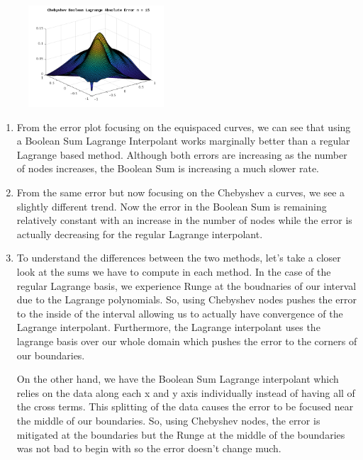 \documentclass[a4paper,12pt]{article}
\begin{document}
\begin{enumerate}[label = \arabic*.]
\begin{figure}[h!]
		\includegraphics[width = 0.45\textwidth]{images/CB15.png}
	\end{figure}

	\newpage
	\begin{enumerate}[label = (\alph*)]
		\item From the error plot focusing on the equispaced curves, we can see that using a Boolean Sum Lagrange Interpolant works marginally better than a regular Lagrange based method. Although both errors are increasing as the number of nodes increases, the Boolean Sum is increasing a much slower rate.
		
		\item From the same error but now focusing on the Chebyshev a curves, we see a slightly different trend. Now the error in the Boolean Sum is remaining relatively constant with an increase in the number of nodes while the error is actually decreasing for the regular Lagrange interpolant.
		 
		\item To understand the differences between the two methods, let's take a closer look at the sums we have to compute in each method. In the case of the regular Lagrange basis, we experience Runge at the boudnaries of our interval due to the Lagrange polynomials. So, using Chebyshev nodes pushes the error to the inside of the interval allowing us to actually have convergence of the Lagrange interpolant. Furthermore, the Lagrange interpolant uses the lagrange basis over our whole domain which pushes the error to the corners of our boundaries.
		
		On the other hand, we have the Boolean Sum Lagrange interpolant which relies on the data along each x and y axis individually instead of having all of the cross terms. This splitting of the data causes the error to be focused near the middle of our boundaries. So, using Chebyshev nodes, the error is mitigated at the boundaries but the Runge at the middle of the boundaries was not bad to begin with so the error doesn't change much.
	\end{enumerate}
	

\end{enumerate}
\end{document}
